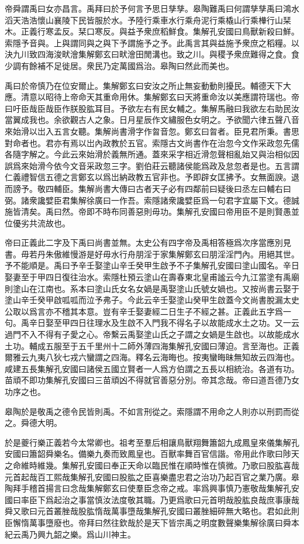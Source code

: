 帝舜謂禹曰女亦昌言。禹拜曰於予何言予思日孳孳。皋陶難禹曰何謂孳孳禹曰鴻水滔天浩浩懷山襄陵下民皆服於水。予陸行乘車水行乘舟泥行乘橇山行乘檋行山栞木。正義行寒孟反。栞口寒反。與益予衆庶稻鮮食。集解孔安國曰鳥獸新殺曰鮮。索隱予音與。上與謂同與之與下予謂施予之予。此禹言其與益施予衆庶之稻糧。以決九川致四海浚畎澮集解鄭玄曰畎澮田閒溝也。致之川。與稷予衆庶難得之食。食少調有餘補不足徙居。衆民乃定萬國爲治。皋陶曰然此而美也。

禹曰於帝慎乃在位安爾止。集解鄭玄曰安汝之所止無妄動動則擾民。輔德天下大應。清意以昭待上帝命天其重命用休。集解鄭玄曰天將重命汝以美應謂符瑞也。帝曰吁臣哉臣哉臣作朕股肱耳目。予欲左右有民女輔之。集解馬融曰我欲左右助民汝當翼成我也。余欲觀古人之象。日月星辰作文繡服色女明之。予欲聞六律五聲八音來始滑以岀入五言女聽。集解尚書滑字作曶音忽。鄭玄曰曶者。臣見君所秉。書思對命者也。君亦有焉以岀內政教於五官。索隱古文尚書作在治忽今文作采政忽先儒各隨字解之。今此云來始滑於義無所通。蓋來采字相近滑忽聲相亂始又與治相似因誤爲來始滑今依今文音采政忽三字。劉伯莊云聽諸侯能爲政及怠忽者是也。五言謂仁義禮智信五德之言鄭玄以爲岀納政教五官非也。予即辟女匡拂予。女無面諛。退而謗予。敬四輔臣。集解尚書大傳曰古者天子必有四鄰前曰疑後曰丞左曰輔右曰弼。諸衆讒嬖臣君集解徐廣曰一作吾。索隱諸衆讒嬖臣爲一句君字宜屬下文。德誠施皆清矣。禹曰然。帝即不時布同善惡則毋功。集解孔安國曰帝用臣不是則賢愚並位優劣共流故也。

帝曰正義此二字及下禹曰尚書並無。太史公有四字帝及禹相答極爲次序當應別見書。毋若丹朱傲維慢游是好毋水行舟朋淫于家集解鄭玄曰朋淫淫門內。用絕其世。予不能順是。禹曰予辛壬娶塗山辛壬癸甲生啟予不子集解孔安國曰塗山國名。辛日娶妻至于甲四日復往治水。索隱杜預云塗山在壽春東北皇甫謐云今九江當塗有禹廟則塗山在江南也。系本曰塗山氏女名女媧是禹娶塗山氏號女媧也。又按尚書云娶于塗山辛壬癸甲啟呱呱而泣予弗子。今此云辛壬娶塗山癸甲生啟蓋今文尚書脫漏太史公取以爲言亦不稽其本意。豈有辛壬娶妻經二日生子不經之甚。正義此五字爲一句。禹辛日娶至甲四日往理水及生啟不入門我不得名子以故能成水土之功。又一云過門不入不得有子愛之心。帝繫云禹娶塗山氏之子謂之女媧是生啟也。以故能成水土功。輔成五服至于五千里州十二師外薄四海集解孔安國曰薄迫。言至海也。正義爾雅云九夷八狄七戎六蠻謂之四海。釋名云海晦也。按夷蠻晦昧無知故云四海也。咸建五長集解孔安國曰諸侯五國立賢者一人爲方伯謂之五長以相統治。各道有功。苗頑不即功集解孔安國曰三苗頑凶不得就官善惡分別。帝其念哉。帝曰道吾德乃女功序之也。

皋陶於是敬禹之德令民皆則禹。不如言刑從之。索隱謂不用命之人則亦以刑罰而從之。舜德大明。

於是夔行樂正義若今太常卿也。祖考至羣后相讓鳥獸翔舞簫韶九成鳳皇來儀集解孔安國曰簫韶舜樂名。備樂九奏而致鳳皇也。百獸率舞百官信諧。帝用此作歌曰陟天之命維時維幾。集解孔安國曰奉正天命以臨民惟在順時惟在慎微。乃歌曰股肱喜哉元首起哉百工熙哉集解孔安國曰股肱之臣喜樂盡忠君之治功乃起百官之業乃廣。皋陶拜手稽首揚言曰念哉集解鄭玄曰使羣臣念帝之戒。率爲興事慎乃憲敬哉集解孔安國曰率臣下爲起治之事當慎汝法度敬其職。乃更爲歌曰元首明哉股肱良哉庶事康哉舜又歌曰元首叢脞哉股肱惰哉萬事墮哉集解孔安國曰叢脞細碎無大略也。君如此則臣懈惰萬事墮廢也。帝拜曰然往欽哉於是天下皆宗禹之明度數聲樂集解徐廣曰舜本紀云禹乃興九韶之樂。爲山川神主。

